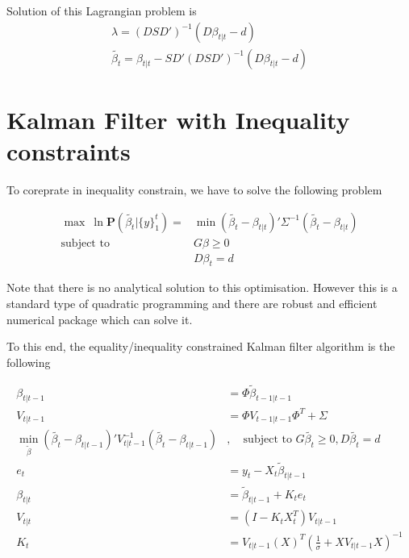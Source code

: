 \documentclass{article}
\theoremstyle{plain}
\theoremstyle{definition}
\theoremstyle{remark}
\newcommand{\PP}{\mathbf{P}}
\begin{document}
Solution of this Lagrangian problem is 
\begin{eqnarray}
\lambda = (D S D')^{-1} ( D \beta_{t|t}- d)\\
\tilde{\beta_t} = \beta_{t|t} - S D' ( D S D')^{-1} (D \beta_{t|t} - d)
\end{eqnarray}
\section{Kalman Filter with Inequality constraints}
To coreprate in inequality constrain, we have to solve the following problem 

\begin{equation}
\begin{split}
\max \: \ln \PP(\tilde{\beta_t} | \{y\}^t_1) = &\min (\tilde{\beta_t}  - \beta_{t|t})' \Sigma^{-1} (\tilde{\beta_t}  - \beta_{t|t})\\
\mbox{subject to } & G\beta \geq 0 \\ & D\beta_t = d
\end{split}
\end{equation}

Note that there is no analytical solution to this optimisation. However this is a standard type of quadratic programming and there are robust and efficient numerical package which can solve it.

To this end, the equality/inequality constrained Kalman filter algorithm is the following

\begin{equation}
\begin{split}
\beta_{t|t-1} &=\Phi \tilde{ \beta}_{t-1|t-1}\\
V_{t|t-1} &= \Phi V_{t-1|t-1}\Phi^T  + \Sigma \\
\min_{\tilde{\beta}} (\tilde{\beta_t}  - \beta_{t|t-1})' V_{t|t-1}^{-1} (\tilde{\beta_t}  - \beta_{t|t-1})&, \quad \mbox{subject to } G\tilde{\beta_t} \geq 0 ,D \tilde{\beta_t} = d\\
e_t &= y_t -  X_t\tilde{ \beta}_{t|t-1} \\
\beta_{t|t} &= \tilde{\beta}_{t|t-1} + K_t e_t\\
V_{t|t} &= (I - K_t X_t^T) V_{t|t-1}\\
K_t &=  V_{t|t-1} (X)^T (\frac1\sigma + X V_{t|t-1} X )^{-1}
\end{split}
\end{equation}
\end{document}
